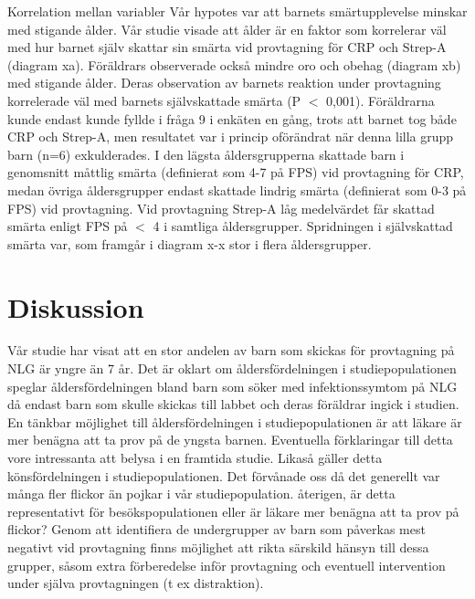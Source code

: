 \documentclass[12pt,twocolumn]{article}
\begin{document}
Korrelation mellan variabler V\r{a}r hypotes var att barnets sm\"artupplevelse minskar
med stigande \r{a}lder. V\r{a}r studie visade att \r{a}lder \"ar en faktor som korrelerar v\"al
med hur barnet sj\"alv skattar sin sm\"arta vid provtagning f\"or CRP och Strep-A
(diagram xa). F\"or\"aldrars observerade ocks\r{a} mindre oro och obehag (diagram xb)
med stigande \r{a}lder. Deras observation av barnets reaktion under provtagning
korrelerade v\"al med barnets sj\"alvskattade sm\"arta (P $<$ 0,001).
F\"or\"aldrarna kunde endast kunde fyllde i fr\r{a}ga 9 i enk\"aten en g\r{a}ng, trots att barnet tog b\r{a}de CRP
och Strep-A, men resultatet var i princip of\"or\"andrat n\"ar denna lilla grupp barn
(n=6) exkulderades. I den l\"agsta \r{a}ldersgrupperna skattade barn i genomsnitt
m\r{a}ttlig sm\"arta (definierat som 4-7 p\r{a} FPS) vid provtagning f\"or CRP, medan \"ovriga
\r{a}ldersgrupper endast skattade lindrig sm\"arta (definierat som 0-3 p\r{a} FPS) vid
provtagning. Vid provtagning Strep-A l\r{a}g medelv\"ardet f\r{a}r skattad sm\"arta enligt
FPS p\r{a} $<$ 4 i samtliga \r{a}ldersgrupper. Spridningen i sj\"alvskattad
sm\"arta var, som framg\r{a}r i diagram x-x stor i flera \r{a}ldersgrupper.

\section{Diskussion}

V\r{a}r studie har visat att en stor andelen av barn som skickas f\"or provtagning p\r{a}
NLG \"ar yngre \"an 7 \r{a}r. Det \"ar oklart om \r{a}ldersf\"ordelningen i studiepopulationen
speglar \r{a}ldersf\"ordelningen bland barn som s\"oker med infektionssymtom p\r{a} NLG d\r{a}
endast barn som skulle skickas till labbet och deras f\"or\"aldrar ingick i studien.
En t\"ankbar m\"ojlighet till \r{a}ldersf\"ordelningen i studiepopulationen \"ar att l\"akare
\"ar mer ben\"agna att ta prov p\r{a} de yngsta barnen. Eventuella f\"orklaringar till
detta vore intressanta att belysa i en framtida studie. Likas\r{a} g\"aller detta
k\"onsf\"ordelningen i studiepopulationen. Det f\"orv\r{a}nade oss d\r{a} det generellt var
m\r{a}nga fler flickor \"an pojkar i v\r{a}r studiepopulation. \r{a}terigen, \"ar detta
representativt f\"or bes\"okspopulationen eller \"ar l\"akare mer ben\"agna att ta prov p\r{a}
flickor? Genom att identifiera de undergrupper av barn som p\r{a}verkas mest
negativt vid provtagning finns m\"ojlighet att rikta s\"arskild h\"ansyn till dessa
grupper, s\r{a}som extra f\"orberedelse inf\"or provtagning och eventuell intervention
under sj\"alva provtagningen (t ex distraktion).
\end{document}
